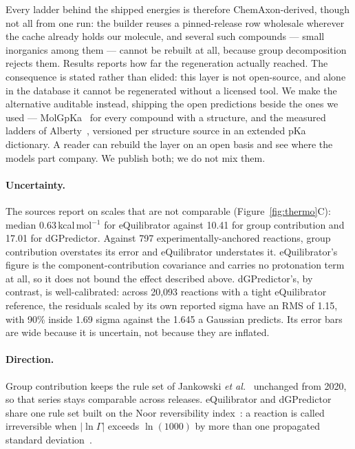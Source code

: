 Every ladder behind the shipped energies is therefore ChemAxon-derived, though
not all from one run: the builder reuses a pinned-release row wholesale wherever
the cache already holds our molecule, and several such compounds --- small
inorganics among them --- cannot be rebuilt at all, because group decomposition
rejects them. Results reports how far the regeneration actually reached. The
consequence is stated rather than elided: this layer is not open-source, and
alone in the database it cannot be regenerated without a licensed tool. We make
the alternative auditable instead, shipping the open predictions beside the ones
we used --- MolGpKa~\cite{pan2021} for every compound with a structure, and the
measured ladders of Alberty~\cite{alberty2003}, versioned per structure source
in an extended pKa dictionary. A reader can rebuild the layer on an open basis
and see where the models part company. We publish both; we do not mix them.

\paragraph{Uncertainty.} The sources report on scales that are not comparable
(Figure~\ref{fig:thermo}C): median 0.63\,kcal\,mol$^{-1}$ for eQuilibrator
against 10.41 for group contribution and 17.01 for dGPredictor. Against 797
experimentally-anchored reactions, group contribution overstates its error and
eQuilibrator understates it. eQuilibrator's figure is the
component-contribution covariance and carries no protonation term at all, so it
does not bound the effect described above. dGPredictor's, by contrast, is
well-calibrated: across 20,093 reactions with a tight eQuilibrator reference,
the residuals scaled by its own reported sigma have an RMS of 1.15, with 90\%
inside 1.69 sigma against the 1.645 a Gaussian predicts. Its error bars are
wide because it is uncertain, not because they are inflated.

\paragraph{Direction.} Group contribution keeps the rule set of Jankowski
\textit{et al.}~\cite{jankowski2008} unchanged from 2020, so that series stays
comparable across releases. eQuilibrator and dGPredictor share one rule set
built on the Noor reversibility index~\cite{noor2012}: a reaction is called
irreversible when $|\ln\Gamma|$ exceeds $\ln(1000)$ by more than one propagated
standard deviation~\cite{beber2022}.

